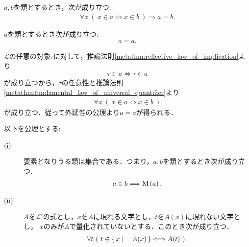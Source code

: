 	\begin{screen}
		\begin{axm}[外延性の公理]
			$a,b$を類とするとき，次が成り立つ:
			\begin{align}
				\forall x\ (\ x \in a  \Longleftrightarrow x \in b\ )
				\Longrightarrow a=b.
			\end{align}
		\end{axm}
	\end{screen}
	
	\begin{screen}
		\begin{thm}[任意の類は自分自身と等しい]\label{thm:any_class_equals_to_itself}
			$a$を類とするとき次が成り立つ:
			\begin{align}
				a = a.
			\end{align}
		\end{thm}
	\end{screen}
	
	\begin{prf}
		$\mathcal{L}$の任意の対象$\tau$に対して，推論法則\ref{metathm:reflective_law_of_implication}より
		\begin{align}
			\tau \in a \Longleftrightarrow \tau \in a
		\end{align}
		が成り立つから，$\tau$の任意性と推論法則\ref{metathm:fundamental_law_of_universal_quantifier}より
		\begin{align}
			\forall x\ (\ x \in a  \Longleftrightarrow x \in b\ )
		\end{align}
		が成り立つ．従って外延性の公理より$a = a$が得られる．
		\QED
	\end{prf}
	
	\begin{screen}
		\begin{axm}[類の公理] 以下を公理とする:
			\begin{description}
				\item[(i)] 要素となりうる類は集合である．つまり，$a,b$を類とするとき次が成り立つ．
					\begin{align}
						a \in b \Longrightarrow \operatorname*{M}\left(a\right).
					\end{align}
					
					
				\item[(ii)] $A$を$\mathcal{L}'$の式とし，$x$を$A$に現れる文字とし，$t$を$A(x)$に現れない文字とし，
					$x$のみが$A$で量化されていないとする．このとき次が成り立つ．
					\begin{align}
						\forall t\ (\ t \in \left\{\, x \mid \quad A(x)\, \right\} \Longleftrightarrow A(t)\ ).
					\end{align}
			\end{description}
		\end{axm}
	\end{screen}
	
